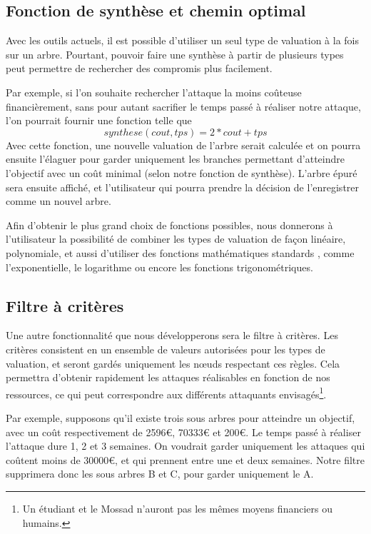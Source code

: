     \subsection{Fonction de synthèse et chemin optimal}
        \label{sec:fct_synth}

        Avec les outils actuels, il est possible d'utiliser un seul type de valuation à la fois sur un arbre. Pourtant, pouvoir faire une synthèse à partir de plusieurs types peut permettre de rechercher des compromis plus facilement.

        Par exemple, si l'on souhaite rechercher l'attaque la moins coûteuse financièrement, sans pour autant sacrifier le temps passé à réaliser notre attaque, l'on pourrait fournir une fonction telle que \[ synthese(cout, tps) = 2*cout + tps \] 
        Avec cette fonction, une nouvelle valuation de l'arbre serait calculée et on pourra ensuite l'élaguer pour garder uniquement les branches permettant d'atteindre l'objectif avec un coût minimal (selon notre fonction de synthèse). 
        L'arbre épuré sera ensuite affiché, et l'utilisateur qui pourra prendre la décision de l'enregistrer comme un nouvel arbre.

        Afin d'obtenir le plus grand choix de fonctions possibles, nous donnerons à l'utilisateur la possibilité de combiner les types de valuation de façon linéaire, polynomiale, et aussi d'utiliser des fonctions mathématiques \og standards \fg, comme l'exponentielle, le logarithme ou encore les fonctions trigonométriques.

    \subsection{Filtre à critères}
        \label{sec:filtre}

        Une autre fonctionnalité que nous développerons sera le filtre à critères. Les critères consistent en un ensemble de valeurs autorisées pour les types de valuation, et seront gardés uniquement les nœuds respectant ces règles. Cela permettra d'obtenir rapidement les attaques réalisables en fonction de nos ressources, ce qui peut correspondre aux différents attaquants envisagés\footnote{Un étudiant et le Mossad n'auront pas les mêmes moyens financiers ou humains.}.

        Par exemple, supposons qu'il existe trois sous arbres pour atteindre un objectif, avec un coût respectivement de 2596\euro{}, 70333\euro{} et 200\euro{}. Le temps passé à réaliser l'attaque dure 1, 2 et 3 semaines. On voudrait garder uniquement les attaques qui coûtent moins de 30000\euro{}, et qui prennent entre une et deux semaines. Notre filtre supprimera donc les sous arbres B et C, pour garder uniquement le A.

